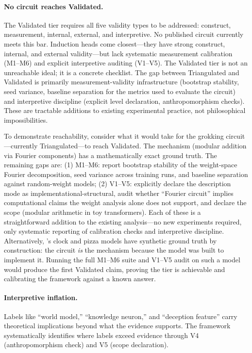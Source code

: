 \documentclass{article}
\begin{document}
\paragraph{No circuit reaches Validated.} The Validated tier requires all five validity types to be addressed: construct, measurement, internal, external, and interpretive. No published circuit currently meets this bar. Induction heads come closest---they have strong construct, internal, and external validity---but lack systematic measurement calibration (M1--M6) and explicit interpretive auditing (V1--V5). The Validated tier is not an unreachable ideal; it is a concrete checklist. The gap between Triangulated and Validated is primarily measurement-validity infrastructure (bootstrap stability, seed variance, baseline separation for the metrics used to evaluate the circuit) and interpretive discipline (explicit level declaration, anthropomorphism checks). These are tractable additions to existing experimental practice, not philosophical impossibilities.

To demonstrate reachability, consider what it would take for the grokking circuit---currently Triangulated---to reach Validated. The mechanism (modular addition via Fourier components) has a mathematically exact ground truth. The remaining gaps are: (1) M1--M6: report bootstrap stability of the weight-space Fourier decomposition, seed variance across training runs, and baseline separation against random-weight models; (2) V1--V5: explicitly declare the description mode as implementational-structural, audit whether ``Fourier circuit'' implies computational claims the weight analysis alone does not support, and declare the scope (modular arithmetic in toy transformers). Each of these is a straightforward addition to the existing analysis---no new experiments required, only systematic reporting of calibration checks and interpretive discipline. Alternatively, \citet{nanda2023progress}'s clock and pizza models have synthetic ground truth by construction: the circuit \emph{is} the mechanism because the model was built to implement it. Running the full M1--M6 suite and V1--V5 audit on such a model would produce the first Validated claim, proving the tier is achievable and calibrating the framework against a known answer.

\paragraph{Interpretive inflation.} Labels like ``world model,'' ``knowledge neuron,'' and ``deception feature'' carry theoretical implications beyond what the evidence supports. The framework systematically identifies where labels exceed evidence through V4 (anthropomorphism check) and V5 (scope declaration).
\end{document}
